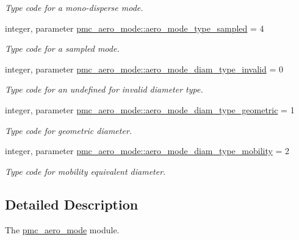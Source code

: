 \begin{DoxyCompactItemize}
\begin{DoxyCompactList}\small\item\em Type code for a mono-\/disperse mode. \end{DoxyCompactList}\item 
integer, parameter \mbox{\hyperlink{namespacepmc__aero__mode_a86073e0512631b231222d9442877828b}{pmc\+\_\+aero\+\_\+mode\+::aero\+\_\+mode\+\_\+type\+\_\+sampled}} = 4
\begin{DoxyCompactList}\small\item\em Type code for a sampled mode. \end{DoxyCompactList}\item 
integer, parameter \mbox{\hyperlink{namespacepmc__aero__mode_a077d0096a03191f4143833e2ae2282cf}{pmc\+\_\+aero\+\_\+mode\+::aero\+\_\+mode\+\_\+diam\+\_\+type\+\_\+invalid}} = 0
\begin{DoxyCompactList}\small\item\em Type code for an undefined for invalid diameter type. \end{DoxyCompactList}\item 
integer, parameter \mbox{\hyperlink{namespacepmc__aero__mode_ac8c82b18cfaa8e5b9725d7e891f57ed7}{pmc\+\_\+aero\+\_\+mode\+::aero\+\_\+mode\+\_\+diam\+\_\+type\+\_\+geometric}} = 1
\begin{DoxyCompactList}\small\item\em Type code for geometric diameter. \end{DoxyCompactList}\item 
integer, parameter \mbox{\hyperlink{namespacepmc__aero__mode_add8ce2fd804c423ed56bee1f62273804}{pmc\+\_\+aero\+\_\+mode\+::aero\+\_\+mode\+\_\+diam\+\_\+type\+\_\+mobility}} = 2
\begin{DoxyCompactList}\small\item\em Type code for mobility equivalent diameter. \end{DoxyCompactList}\end{DoxyCompactItemize}


\subsection{Detailed Description}
The \mbox{\hyperlink{namespacepmc__aero__mode}{pmc\+\_\+aero\+\_\+mode}} module. 

